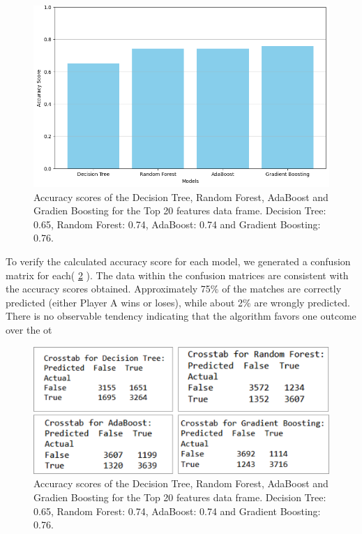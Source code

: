 %
\begin{figure}[h]
\includegraphics[width=\textwidth]{pictures/accuracy_score_models.png}
\caption{Accuracy scores of the Decision Tree, Random Forest, AdaBoost and Gradien Boosting for the Top 20 features data frame. Decision Tree: 0.65, Random Forest: 0.74, AdaBoost: 0.74 and Gradient Boosting: 0.76.}
\label{accuracy_score_models}
\end{figure}
%
To verify the calculated accuracy score for each model, we generated a confusion matrix for each( \ref{confusion_matrix} ). The data within the confusion matrices are consistent with the accuracy scores obtained. Approximately 75\% of the matches are correctly predicted (either Player A wins or loses), while about 2\% are wrongly predicted. There is no observable tendency indicating that the algorithm favors one outcome over the ot 
%
\begin{figure}[h]
\includegraphics[width=\textwidth]{pictures/confusion_matrix.png}
\caption{Accuracy scores of the Decision Tree, Random Forest, AdaBoost and Gradien Boosting for the Top 20 features data frame. Decision Tree: 0.65, Random Forest: 0.74, AdaBoost: 0.74 and Gradient Boosting: 0.76.}
\label{confusion_matrix}
\end{figure}
%

